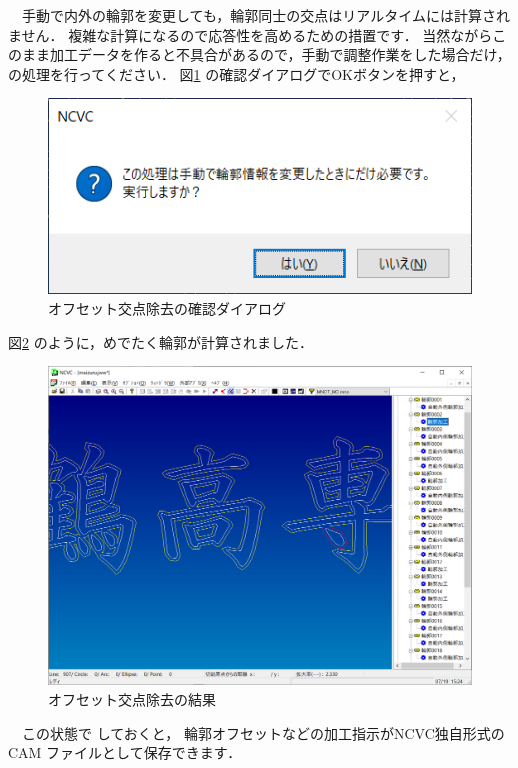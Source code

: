 

\vspace*{1.5zh}
　手動で内外の輪郭を変更しても，輪郭同士の交点はリアルタイムには計算されません．
複雑な計算になるので応答性を高めるための措置です．
当然ながらこのまま加工データを作ると不具合があるので，手動で調整作業をした場合だけ，
 の処理を行ってください．
図\ref{fig:offset1.png} の確認ダイアログでOKボタンを押すと，

\begin{figure}[H]
\centering
\includegraphics{No4/fig/dialog.png}
\caption{オフセット交点除去の確認ダイアログ}
\label{fig:offset1.png}
\end{figure}

図\ref{fig:offset2.png} のように，めでたく輪郭が計算されました．

\begin{figure}[H]
\centering
\includegraphics[scale=0.5]{No4/fig/offset.png}
\caption{オフセット交点除去の結果}
\label{fig:offset2.png}
\end{figure}

　この状態で しておくと，
輪郭オフセットなどの加工指示がNCVC独自形式の CAM ファイルとして保存できます．